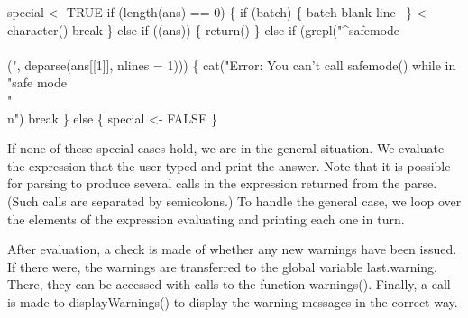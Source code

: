 \documentclass[a4paper]{article}%
\begin{document}
\nwenddocs{}\endmoddef\nwstartdeflinemarkup{}\nwenddeflinemarkup
special <- TRUE
if (length(ans) == 0) \{
    if (batch) \{
        \LA{}batch blank line~{\nwtagstyle{}}\RA{}
    \}
     <- character()
    break
\} else if ((ans)) \{
    return()
\} else if (grepl("^safemode\\\\(",
               deparse(ans[[1]], nlines = 1))) \{
    cat("Error: You can't call safemode() while in \\"safe mode\\"\\n")
    break
\} else \{
    special <- FALSE
\}
\nwendcode{}\nwdocspar

If none of these special cases hold, we are in the general situation.
We evaluate the expression that the user typed and print the answer.
Note that it is possible for parsing to produce several calls in the
expression returned from the parse.  (Such calls are separated by
semicolons.) To handle the general case, we loop over the elements of
the expression evaluating and printing each one in turn.

After evaluation, a check
is made of whether any new warnings have been issued.  If there were,
the warnings are transferred to the global variable
{\Tt{}last.warning\nwendquote}. There, they can be accessed with calls to the
function {\Tt{}warnings()\nwendquote}.  Finally, a call is made to {\Tt{}displayWarnings()\nwendquote}
to display the warning messages in the correct way.
\end{document}
